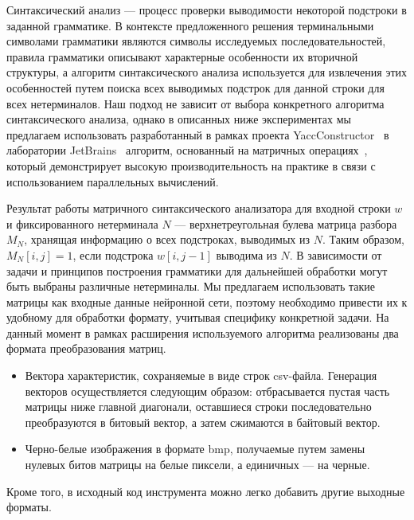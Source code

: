 Синтаксический анализ --- процесс проверки выводимости некоторой подстроки в заданной грамматике. В контексте предложенного решения терминальными символами грамматики являются символы исследуемых последовательностей, правила грамматики описывают характерные особенности их вторичной структуры, а алгоритм синтаксического анализа используется для извлечения этих особенностей путем поиска всех выводимых подстрок для данной строки для всех нетерминалов. Наш подход не зависит от выбора конкретного алгоритма синтаксического анализа, однако в описанных ниже экспериментах мы предлагаем использовать разработанный в рамках проекта YaccConstructor~\cite{yacc} в лаборатории JetBrains~\cite{jetbrains} алгоритм, основанный на матричных операциях~\cite{Azimov:2018:CPQ:3210259.3210264}, который демонстрирует высокую производительность на практике в связи с использованием параллельных вычислений.

Результат работы матричного синтаксического анализатора для входной строки $w$ и фиксированного нетерминала  $N$ --- верхнетреугольная булева матрица разбора $M_N$, хранящая информацию о всех подстроках, выводимых из $N$. Таким образом, $M_N[i,j]=1$, если подстрока $w[i,j-1]$  выводима из $N$. В зависимости от задачи и принципов построения грамматики для дальнейшей обработки могут быть выбраны различные нетерминалы. Мы предлагаем использовать такие матрицы как входные данные нейронной сети, поэтому необходимо привести их к удобному для обработки формату, учитывая специфику конкретной задачи. На данный момент в рамках расширения используемого алгоритма реализованы два формата преобразования матриц.
\begin{itemize}
    \item Вектора характеристик, сохраняемые в виде строк csv-файла. Генерация векторов осуществляется следующим образом: отбрасывается пустая часть матрицы ниже главной диагонали, оставшиеся строки последовательно преобразуются в битовый вектор, а затем сжимаются в байтовый вектор.
    \item Черно-белые изображения в формате bmp, получаемые путем замены нулевых битов матрицы на белые пиксели, а единичных --- на черные.
\end{itemize}
Кроме того, в исходный код инструмента можно легко добавить другие выходные форматы.

